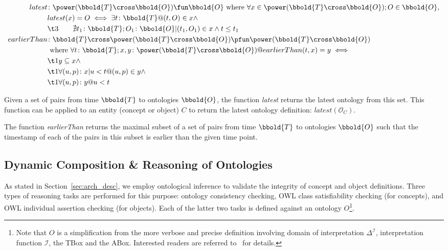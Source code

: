 \documentclass[preprint,12pt]{elsarticle}
\begin{document}
\begin{align}
latest&\colon\power(\bbold{T}\cross\bbold{O})\fun \bbold{O}\text{ where } \forall x\in\power(\bbold{T}\cross\bbold{O});O\in\bbold{O}, \label{eqn:latest}\\
      & latest(x) = O\iff\nonumber \exists t\colon\bbold{T} @ (t,O)\in x \land\nonumber\\
      &\t3\quad~~~ \nexists t_1\colon\bbold{T};O_1\colon\bbold{O} |(t_1,O_1)\in x \land t\leq t_1\nonumber\\
earlierThan&\colon\bbold{T}\cross\power(\bbold{T}\cross\bbold{O})\pfun\power(\bbold{T}\cross\bbold{O})\label{eqn:earlier}\\
      &\text{ where } \forall t\colon\bbold{T};x,y\colon \power(\bbold{T}\cross\bbold{O}) @ earlierThan(t,x) = y \iff\nonumber\\
      &\t1 y\subseteq x\land \nonumber\\
      &\t1 \forall (u,p)\colon x | u < t @ (u,p)\in y\land \nonumber\\
      &\t1 \forall (u,p)\colon y @ u < t\nonumber
\end{align}

Given a set of pairs from time $\bbold{T}$ to ontologies $\bbold{O}$, the function \emph{latest} returns the latest ontology from this set. This function can be applied to an entity (concept or object) $C$ to return the latest ontology definition: $latest(\mathcal{O}_C)$.

The function \emph{earlierThan} returns the maximal subset of a set of pairs from time $\bbold{T}$ to ontologies $\bbold{O}$ such that the timestamp of each of the pairs in this subset is earlier than the given time point.

\subsection{Dynamic Composition \& Reasoning of Ontologies}\label{sec:locality}
As stated in Section~\ref{sec:arch_desc}, we employ ontological inference to validate the integrity of concept and object definitions. Three types of reasoning tasks are performed for this purpose: ontology consistency checking, OWL class satisfiability checking (for concepts), and OWL individual assertion checking (for objects). Each of the latter two tasks is defined against an ontology $O$\footnote{Note that $O$ is a simplification from the more verbose and precise definition involving domain of interpretation $\Delta^\mathcal{I}$, interpretation function $\mathcal{I}$, the TBox and the ABox. Interested readers are referred to~\cite{basicdl03} for details.}.
\end{document}
